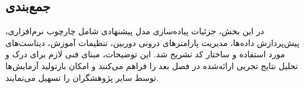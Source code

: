 \subsection{جمع‌بندی}

در این بخش، جزئیات پیاده‌سازی مدل پیشنهادی شامل چارچوب نرم‌افزاری، پیش‌پردازش داده‌ها، مدیریت پارامترهای درونی دوربین، تنظیمات آموزش، دیتاست‌های مورد استفاده و ساختار کد تشریح شد. این توضیحات، مبنای فنی لازم برای درک و تحلیل نتایج تجربی ارائه‌شده در فصل بعد را فراهم می‌کنند و امکان بازتولید آزمایش‌ها توسط سایر پژوهشگران را تسهیل می‌نمایند.
